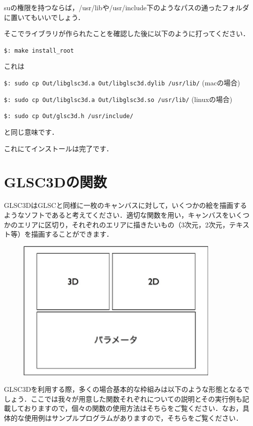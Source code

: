 \documentclass[platex,a4paper,12pt]{jsarticle}%
\begin{document}
suの権限を持つならば，/usr/libや/usr/include下のようなパスの通ったフォルダに置いてもいいでしょう．

そこでライブラリが作られたことを確認した後に以下のように打ってください．

\verb|$: make install_root |

これは

\verb|$: sudo cp Out/libglsc3d.a Out/libglsc3d.dylib /usr/lib/| (macの場合)

\verb|$: sudo cp Out/libglsc3d.a Out/libglsc3d.so /usr/lib/| (linuxの場合)

\verb|$: sudo cp Out/glsc3d.h /usr/include/|

と同じ意味です．

これにてインストールは完了です．

\newpage
\section{GLSC3Dの関数}

GLSC3DはGLSCと同様に一枚のキャンバスに対して，いくつかの絵を描画するようなソフトであると考えてください．適切な関数を用い，キャンバスをいくつかのエリアに区切り，それぞれのエリアに描きたいもの（3次元，2次元，テキスト等）を描画することができます．
\begin{figure}[htb]
	\includegraphics[width=100mm]{./Figures/eps/Canvas_kansu_gaiyo.eps}
\end{figure}

GLSC3Dを利用する際，多くの場合基本的な枠組みは以下のような形態となるでしょう．ここでは我々が用意した関数それぞれについての説明とその実行例も記載しておりますので，個々の関数の使用方法はそちらをご覧ください．なお，具体的な使用例はサンプルプログラムがありますので，そちらをご覧ください．\\
\end{document}

